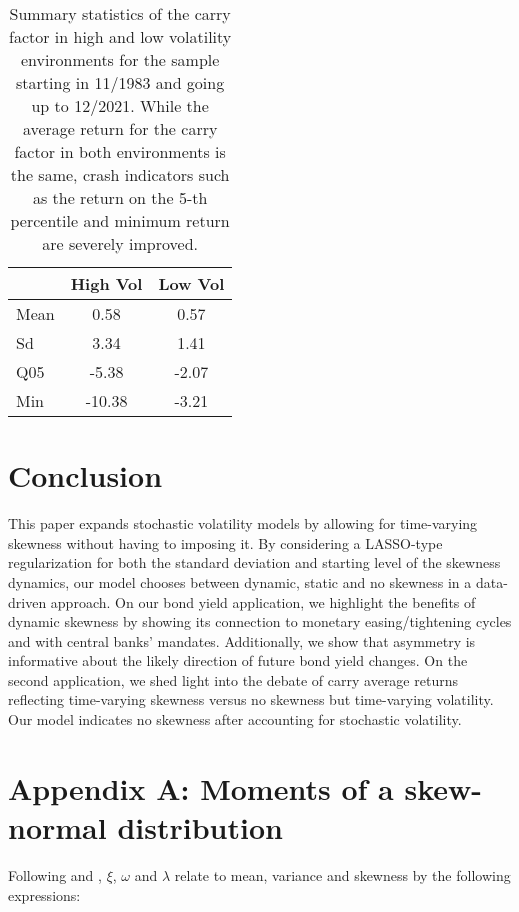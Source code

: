 \documentclass{article}
\begin{document}
\begin{table}[ht]
\centering
\begin{tabular}{lcc}
  \hline
 & High Vol & Low Vol \\ 
  \hline
Mean & 0.58 & 0.57 \\ 
Sd & 3.34 & 1.41 \\ 
Q05 & -5.38 & -2.07 \\ 
Min & -10.38 & -3.21 \\ 
   \hline
\end{tabular}
\caption{Summary statistics of the carry factor in high and low volatility environments for the sample starting in 11/1983 and going up to 12/2021. While the average return for the carry factor in both environments is the same, crash indicators such as the return on the 5-th percentile and minimum return are severely improved. }
\label{Tab:Results_carry}
\end{table}

\section{Conclusion} \label{Sec:Conclusion}

This paper expands stochastic volatility models by allowing for time-varying skewness without having to imposing it. By considering a LASSO-type regularization for both the standard deviation and starting level of the skewness dynamics, our model chooses between dynamic, static and no skewness in a data-driven approach. On our bond yield application, we highlight the benefits of dynamic skewness by showing its connection to monetary easing/tightening cycles and with central banks' mandates. Additionally, we show that asymmetry is informative about the likely direction of future bond yield changes. On the second application, we shed light into the debate of carry average returns reflecting time-varying skewness versus no skewness but time-varying volatility. Our model indicates no skewness after accounting for stochastic volatility.

\clearpage
\renewcommand\bibname{References}


\clearpage
\section*{Appendix A: Moments of a skew-normal distribution}

Following \cite{azzalini1985class} and \cite{bayes2007bayesian},  $\xi$, $\omega$ and $\lambda$ relate to mean, variance and skewness by the following expressions:
\end{document}
